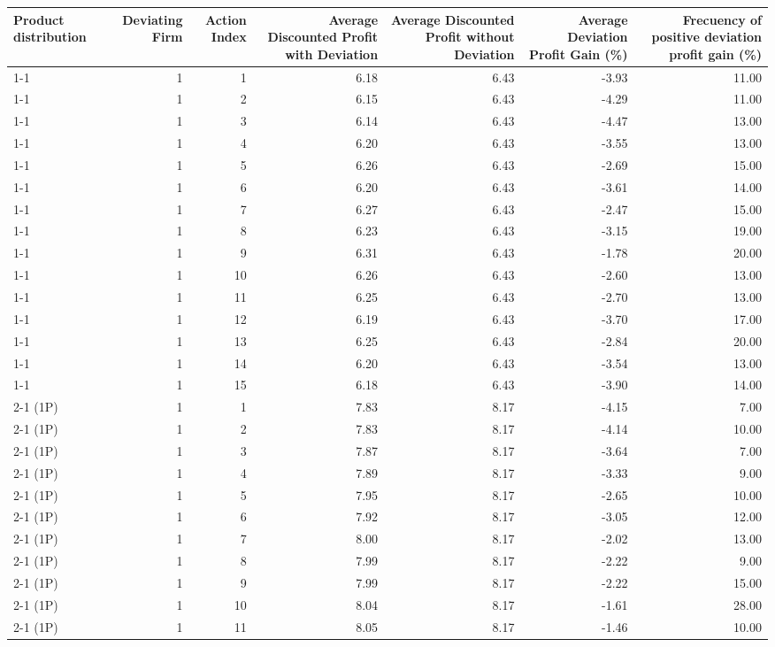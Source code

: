 \begin{tabular}{lrrrrrr}
\toprule
Product distribution & Deviating Firm & Action Index & Average Discounted Profit with Deviation & Average Discounted Profit without Deviation & Average Deviation Profit Gain (\%) & Frecuency of positive deviation profit gain (\%) \\
\midrule
1-1 & 1 & 1 & 6.18 & 6.43 & -3.93 & 11.00 \\
1-1 & 1 & 2 & 6.15 & 6.43 & -4.29 & 11.00 \\
1-1 & 1 & 3 & 6.14 & 6.43 & -4.47 & 13.00 \\
1-1 & 1 & 4 & 6.20 & 6.43 & -3.55 & 13.00 \\
1-1 & 1 & 5 & 6.26 & 6.43 & -2.69 & 15.00 \\
1-1 & 1 & 6 & 6.20 & 6.43 & -3.61 & 14.00 \\
1-1 & 1 & 7 & 6.27 & 6.43 & -2.47 & 15.00 \\
1-1 & 1 & 8 & 6.23 & 6.43 & -3.15 & 19.00 \\
1-1 & 1 & 9 & 6.31 & 6.43 & -1.78 & 20.00 \\
1-1 & 1 & 10 & 6.26 & 6.43 & -2.60 & 13.00 \\
1-1 & 1 & 11 & 6.25 & 6.43 & -2.70 & 13.00 \\
1-1 & 1 & 12 & 6.19 & 6.43 & -3.70 & 17.00 \\
1-1 & 1 & 13 & 6.25 & 6.43 & -2.84 & 20.00 \\
1-1 & 1 & 14 & 6.20 & 6.43 & -3.54 & 13.00 \\
1-1 & 1 & 15 & 6.18 & 6.43 & -3.90 & 14.00 \\
2-1 (1P) & 1 & 1 & 7.83 & 8.17 & -4.15 & 7.00 \\
2-1 (1P) & 1 & 2 & 7.83 & 8.17 & -4.14 & 10.00 \\
2-1 (1P) & 1 & 3 & 7.87 & 8.17 & -3.64 & 7.00 \\
2-1 (1P) & 1 & 4 & 7.89 & 8.17 & -3.33 & 9.00 \\
2-1 (1P) & 1 & 5 & 7.95 & 8.17 & -2.65 & 10.00 \\
2-1 (1P) & 1 & 6 & 7.92 & 8.17 & -3.05 & 12.00 \\
2-1 (1P) & 1 & 7 & 8.00 & 8.17 & -2.02 & 13.00 \\
2-1 (1P) & 1 & 8 & 7.99 & 8.17 & -2.22 & 9.00 \\
2-1 (1P) & 1 & 9 & 7.99 & 8.17 & -2.22 & 15.00 \\
2-1 (1P) & 1 & 10 & 8.04 & 8.17 & -1.61 & 28.00 \\
2-1 (1P) & 1 & 11 & 8.05 & 8.17 & -1.46 & 10.00 \\

\end{tabular}
